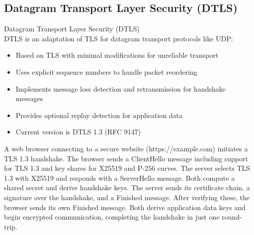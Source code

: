 \subsection{Datagram Transport Layer Security (DTLS)}

\begin{definition}{Datagram Transport Layer Security (DTLS)}\\
DTLS is an adaptation of TLS for datagram transport protocols like UDP:
\begin{itemize}
    \item Based on TLS with minimal modifications for unreliable transport
    \item Uses explicit sequence numbers to handle packet reordering
    \item Implements message loss detection and retransmission for handshake messages
    \item Provides optional replay detection for application data
    \item Current version is DTLS 1.3 (RFC 9147)
\end{itemize}
\end{definition}

\begin{example}
A web browser connecting to a secure website (https://example.com) initiates a TLS 1.3 handshake. The browser sends a ClientHello message including support for TLS 1.3 and key shares for X25519 and P-256 curves. The server selects TLS 1.3 with X25519 and responds with a ServerHello message. Both compute a shared secret and derive handshake keys. The server sends its certificate chain, a signature over the handshake, and a Finished message. After verifying these, the browser sends its own Finished message. Both derive application data keys and begin encrypted communication, completing the handshake in just one round-trip.
\end{example}

